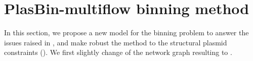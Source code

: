 \section{PlasBin-multiflow binning method}\label{sec:pbmf}

In this section, we propose a new model for the binning problem to answer the issues raised in , and make robust the method to the structural plasmid constraints ().
We first slightly change  of the network graph resulting to .


